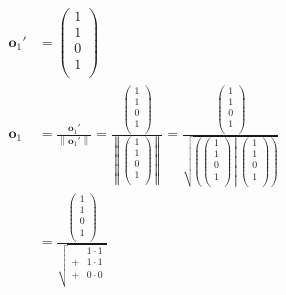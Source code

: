 \documentclass[dvipdfmx]{jsarticle}
\begin{document}
\begin{align*}
\mathbf{o}_{1}' &= \begin{pmatrix}
  1 \\
  1 \\
  0 \\
  1 \\
\end{pmatrix}\\
\mathbf{o}_{1} &= \frac{\mathbf{o}_{1}'}{\left\| \mathbf{o}_{1}' \right\|} = \frac{\begin{pmatrix}
  1 \\
  1 \\
  0 \\
  1 \\
\end{pmatrix}}{\left\| \begin{pmatrix}
  1 \\
  1 \\
  0 \\
  1 \\
\end{pmatrix} \right\|} = \frac{\begin{pmatrix}
  1 \\
  1 \\
  0 \\
  1 \\
\end{pmatrix}}{\sqrt{\left( \begin{pmatrix}
  1 \\
  1 \\
  0 \\
  1 \\
\end{pmatrix} \middle| \begin{pmatrix}
  1 \\
  1 \\
  0 \\
  1 \\
\end{pmatrix} \right)}}\\
&= \frac{\begin{pmatrix}
  1 \\
  1 \\
  0 \\
  1 \\
\end{pmatrix}}{\sqrt{\begin{matrix}
  \  & 1 \cdot 1 \\
   + & 1 \cdot 1 \\
   + & 0 \cdot 0 \\

\end{matrix}}}
\end{align*}
\end{document}
